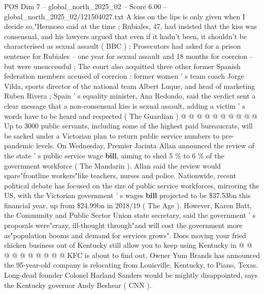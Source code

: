 \begin{textsample}{POS Dim 7 – global\_north\_2025\_02 – Score 6.00 – global\_north\_2025\_02/121504027.txt}
A kiss on the lips is only given when I decide so,"Hermoso said at the time ; Rubiales, 47, had insisted that the kiss was consensual, and his lawyers argued that even if it hadn't been, it shouldn't be characterised as sexual assault ( BBC ) ; Prosecutors had asked for a prison sentence for Rubiales -- one year for sexual assault and 18 months for coercion -- but were unsuccessful ; The court also acquitted three other former Spanish federation members accused of coercion : former women ' s team coach Jorge Vilda, sports director of the national team Albert Luque, and head of marketing Ruben Rivera ; Spain ' s equality minister, Ana Redondo, said the verdict sent a clear message that a non-consensual kiss is sexual assault, adding a victim ' s words have to be heard and respected ( The Guardian ) @ @ @ @ @ @ @ @ @ @ Up to 3000 public servants, including some of the highest paid bureaucrats, will be sacked under a Victorian plan to return public service numbers to pre-pandemic levels.
On Wednesday, Premier Jacinta Allan announced the review of the state ' s public service wage \textbf{bill}, aiming to shed 5 \% to 6 \% of the government workforce ( The Mandarin ).
Allan said the review would spare"frontline workers"like teachers, nurses and police.
Nationwide, recent political debate has focused on the size of public service workforces, mirroring the US, with the Victorian government ' s wages \textbf{bill} projected to be \$37.53bn this financial year, up from \$24.99bn in 2018/19 ( The Age ).
However, Karen Batt, the Community and Public Sector Union state secretary, said the government ' s proposals were"crazy, ill-thought through"and will cost the government more as"population booms and demand for services grows".
Does moving your fried chicken business out of Kentucky still allow you to keep using Kentucky in @ @ @ @ @ @ @ @ @ @ KFC is about to find out.
Owner Yum Brands has announced the 95-year-old company is relocating from Louisville, Kentucky, to Piano, Texas.
Long-dead founder Colonel Harland Sanders would be mightly disappointed, says the Kentucky governor Andy Beshear ( CNN ).

\end{textsample}
